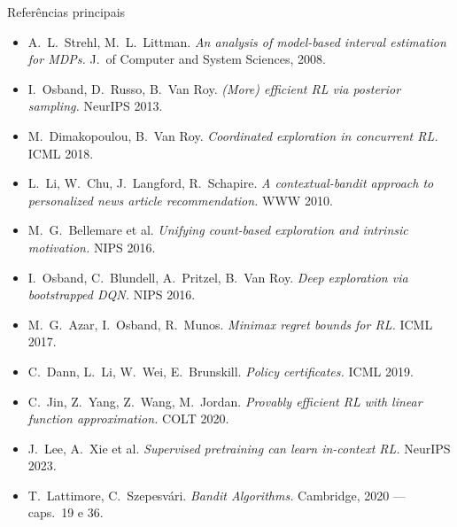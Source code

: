 \documentclass[aspectratio=169, 11pt]{beamer}
\begin{document}
\begin{frame}{Referências principais}
  {\footnotesize
  \begin{itemize}\setlength{\itemsep}{0.15ex}
    \item A.\ L.\ Strehl, M.\ L.\ Littman. \textit{An analysis of model-based interval
          estimation for MDPs.} J.\ of Computer and System Sciences, 2008.
    \item I.\ Osband, D.\ Russo, B.\ Van Roy. \textit{(More) efficient RL via posterior
          sampling.} NeurIPS 2013.
    \item M.\ Dimakopoulou, B.\ Van Roy. \textit{Coordinated exploration in concurrent
          RL.} ICML 2018.
    \item L.\ Li, W.\ Chu, J.\ Langford, R.\ Schapire. \textit{A contextual-bandit
          approach to personalized news article recommendation.} WWW 2010.
    \item M.\ G.\ Bellemare et al. \textit{Unifying count-based exploration and intrinsic
          motivation.} NIPS 2016.
    \item I.\ Osband, C.\ Blundell, A.\ Pritzel, B.\ Van Roy. \textit{Deep exploration
          via bootstrapped DQN.} NIPS 2016.
    \item M.\ G.\ Azar, I.\ Osband, R.\ Munos. \textit{Minimax regret bounds for RL.}
          ICML 2017.
    \item C.\ Dann, L.\ Li, W.\ Wei, E.\ Brunskill. \textit{Policy certificates.} ICML 2019.
    \item C.\ Jin, Z.\ Yang, Z.\ Wang, M.\ Jordan. \textit{Provably efficient RL with
          linear function approximation.} COLT 2020.
    \item J.\ Lee, A.\ Xie et al. \textit{Supervised pretraining can learn in-context
          RL.} NeurIPS 2023.
    \item T.\ Lattimore, C.\ Szepesvári. \textit{Bandit Algorithms.} Cambridge, 2020 ---
          caps.\ 19 e 36.
  \end{itemize}}
\end{frame}
\end{document}
